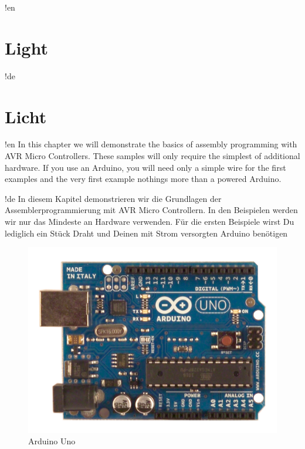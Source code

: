 \documentclass[twoside,12pt,authoryear,openright,a4paper]{book}
\begin{document}
!en \chapter{Light}
!de \chapter{Licht}

!en In this chapter we will demonstrate the basics of assembly programming with AVR Micro Controllers. These samples will only require the simplest of additional hardware. If you use an Arduino, you will need only a simple wire for the first examples and the very first example nothings more than a powered Arduino.

!de In diesem Kapitel demonstrieren wir die Grundlagen der Assemblerprogrammierung mit AVR Micro Controllern. In den Beispielen werden wir nur das Mindeste an Hardware verwenden. Für die ersten Beispiele wirst Du lediglich ein Stück Draht und Deinen mit Strom versorgten Arduino benötigen

\begin{figure}[htbp]
  \centering
  \includegraphics[width=120mm]{Media/www-arduino-cc_ArduinoUnoFront.jpeg}
  \caption{Arduino Uno}
  \label{ArduinoUnoFront}
\end{figure}
\end{document}
